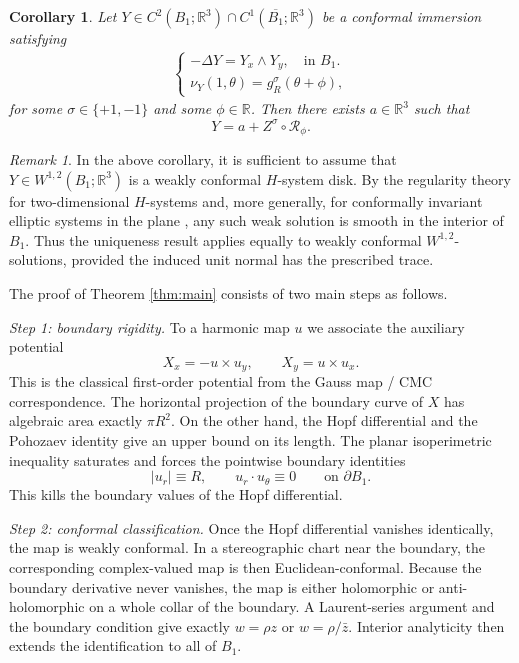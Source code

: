 \documentclass[11pt]{amsart}
\numberwithin{equation}{section}
\newtheorem{corollary}[theorem]{Corollary}
\theoremstyle{remark}
\newtheorem*{remark}{Remark}
\newcommand{\B}{B_1}
\newcommand{\RR}{\mathbb R}
\newcommand{\Rot}{\mathcal R}
\begin{document}
\begin{corollary}\label{cor:normal-trace-Hsystem}
Let $Y\in C^2(\B;\RR^3)\cap C^1(\overline{\B};\RR^3)$ be a conformal immersion satisfying
\begin{align*}\displaystyle
\begin{cases}
        -\Delta Y=Y_x\wedge Y_y,\quad\text{in }\B.\\
        \nu_Y(1,\theta)=g_R^\sigma(\theta+\phi),
\end{cases}
\end{align*}
for some $\sigma\in\{+1,-1\}$ and some $\phi\in\RR$.
Then there exists $a\in\RR^3$ such that
\[
Y=a+Z^\sigma\circ\Rot_\phi.
\]
\end{corollary}

\begin{remark}
In the above corollary, it is sufficient to assume that
\(Y\in W^{1,2}(B_1;\mathbb R^3)\) is a weakly conformal \(H\)-system disk.
By the regularity theory for two-dimensional \(H\)-systems and, more generally,
for conformally invariant elliptic systems in the plane
\cite{Heinz1975,Gruter1981,Riviere2007}, any such weak solution is smooth in
the interior of \(B_1\). Thus the uniqueness result applies equally to weakly
conformal \(W^{1,2}\)-solutions, provided the induced unit normal has the
prescribed trace.
\end{remark}






The proof of Theorem \ref{thm:main} consists of two main steps as follows.

\smallskip
\noindent
\textit{Step 1: boundary rigidity.}
To a harmonic map $u$ we associate the auxiliary potential
\[
X_x=-u\times u_y,
\qquad
X_y=u\times u_x.
\]
This is the classical first-order potential from the Gauss map / CMC correspondence. The horizontal projection of the boundary curve of $X$
has algebraic area exactly $\pi R^2$. On the other hand, the Hopf differential and the Pohozaev identity give an upper bound on its length.
The planar isoperimetric inequality saturates and forces the pointwise boundary identities
\[
|u_r|\equiv R,
\qquad
u_r\cdot u_\theta\equiv0
\qquad\text{on }\partial B_1.
\]
This kills the boundary values of the Hopf differential.

\smallskip
\noindent
\textit{Step 2: conformal classification.}
Once the Hopf differential vanishes identically, the map is weakly conformal. In a stereographic chart near the boundary, the corresponding
complex-valued map is then Euclidean-conformal. Because the boundary derivative never vanishes, the map is either holomorphic or
anti-holomorphic on a whole collar of the boundary. A Laurent-series argument and the boundary condition give exactly $w=\rho z$ or
$w=\rho/\bar z$. Interior analyticity then extends the identification to all of $B_1$.
\end{document}
